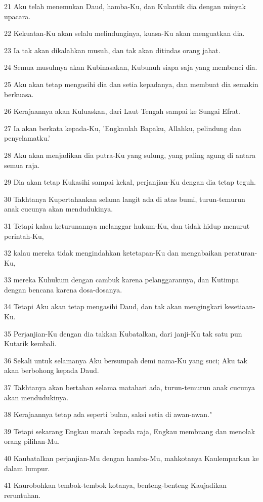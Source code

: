 \par 21 Aku telah menemukan Daud, hamba-Ku, dan Kulantik dia dengan minyak upacara.
\par 22 Kekuatan-Ku akan selalu melindunginya, kuasa-Ku akan menguatkan dia.
\par 23 Ia tak akan dikalahkan musuh, dan tak akan ditindas orang jahat.
\par 24 Semua musuhnya akan Kubinasakan, Kubunuh siapa saja yang membenci dia.
\par 25 Aku akan tetap mengasihi dia dan setia kepadanya, dan membuat dia semakin berkuasa.
\par 26 Kerajaannya akan Kuluaskan, dari Laut Tengah sampai ke Sungai Efrat.
\par 27 Ia akan berkata kepada-Ku, 'Engkaulah Bapaku, Allahku, pelindung dan penyelamatku.'
\par 28 Aku akan menjadikan dia putra-Ku yang sulung, yang paling agung di antara semua raja.
\par 29 Dia akan tetap Kukasihi sampai kekal, perjanjian-Ku dengan dia tetap teguh.
\par 30 Takhtanya Kupertahankan selama langit ada di atas bumi, turun-temurun anak cucunya akan mendudukinya.
\par 31 Tetapi kalau keturunannya melanggar hukum-Ku, dan tidak hidup menurut perintah-Ku,
\par 32 kalau mereka tidak mengindahkan ketetapan-Ku dan mengabaikan peraturan-Ku,
\par 33 mereka Kuhukum dengan cambuk karena pelanggarannya, dan Kutimpa dengan bencana karena dosa-dosanya.
\par 34 Tetapi Aku akan tetap mengasihi Daud, dan tak akan mengingkari kesetiaan-Ku.
\par 35 Perjanjian-Ku dengan dia takkan Kubatalkan, dari janji-Ku tak satu pun Kutarik kembali.
\par 36 Sekali untuk selamanya Aku bersumpah demi nama-Ku yang suci; Aku tak akan berbohong kepada Daud.
\par 37 Takhtanya akan bertahan selama matahari ada, turun-temurun anak cucunya akan mendudukinya.
\par 38 Kerajaannya tetap ada seperti bulan, saksi setia di awan-awan."
\par 39 Tetapi sekarang Engkau marah kepada raja, Engkau membuang dan menolak orang pilihan-Mu.
\par 40 Kaubatalkan perjanjian-Mu dengan hamba-Mu, mahkotanya Kaulemparkan ke dalam lumpur.
\par 41 Kaurobohkan tembok-tembok kotanya, benteng-benteng Kaujadikan reruntuhan.

